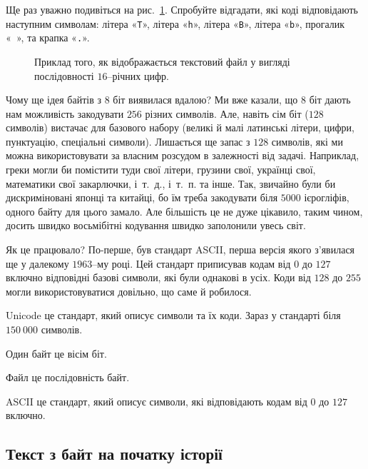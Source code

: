 \documentclass{book}
\newcommand{\bitstr}[1]{{\tt #1}}
\begin{document}
\begin{exercise}
Ще раз уважно подивіться на рис.~\ref{PicHexDump}. Спробуйте відгадати, які коді відповідають наступним символам:
літера «\bitstr{T}»,
літера «\bitstr{h}»,
літера «\bitstr{B}»,
літера «\bitstr{b}»,
прогалик «\bitstr{~}»,
та крапка «\bitstr{.}».
\end{exercise}

\begin{figure}[t]
  \centering
  
  \caption{Приклад того, як відображається текстовий файл у вигляді послідовності $16$--річних цифр.}
  \label{PicHexDump}
\end{figure}

Чому ще ідея байтів з $8$ біт виявилася вдалою?
Ми вже казали, що $8$ біт дають нам можливість закодувати $256$ різних символів.
Але, навіть  сім біт ($128$ символів) вистачає для базового набору (великі й малі латинські літери, цифри, пунктуацію, спеціальні символи).
Лишається ще запас з $128$ символів, які ми можна використовувати за власним розсудом в залежності від задачі.
Наприклад, греки могли би помістити туди свої літери, грузини свої, українці свої, математики свої закарлючки, і~т.~д., і~т.~п. та інше.
Так, звичайно були би дискриміновані японці та китайці, бо їм треба закодувати біля $5000$ ієрогліфів, одного байту для цього замало.
Але більшість це не дуже цікавило, таким чином, досить швидко восьмібітні кодування швидко заполонили увесь світ.

Як це працювало?
По-перше, був стандарт ASCII, перша версія якого з'явилася ще у далекому $1963$--му році.
Цей стандарт приписував кодам від $0$ до $127$ включно відповідні базові символи, які були однакові в усіх.
Коди від $128$ до $255$ могли використовуватися довільно, що саме й робилося.

\begin{summary}
\item Unicode це стандарт, який описує символи та їх коди. Зараз у стандарті біля $150~000$ символів.
\item Один байт це вісім біт.
\item Файл це послідовність байт.
\item ASCII це стандарт, який описує символи, які відповідають кодам від $0$ до $127$ включно.
\end{summary}

\subsection{Текст з байт на початку історії}
\end{document}
